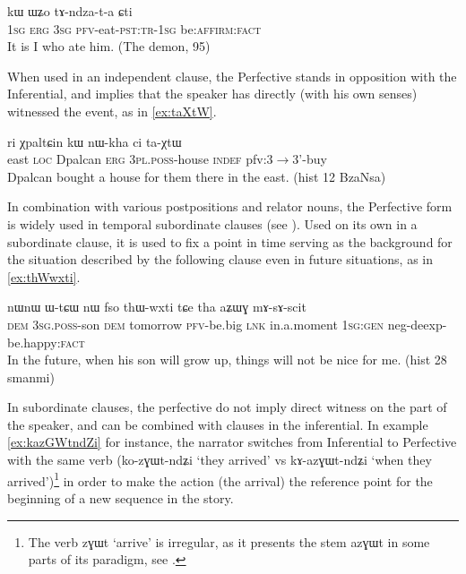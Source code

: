 \documentclass[oldfontcommands,oneside,a4paper,11pt]{article}
\newcommand{\ipa}[1]{{\phon \mbox{#1}}} %
\newcommand{\factual}[1]{\textsc{:fact}}
\begin{document}
\begin{exe}
\ex \label{ex:tAndzata}
\gll \ipa{aʑo} 	\ipa{kɯ} 	\ipa{ɯʑo} 	\ipa{tɤ-ndza-t-a} 	\ipa{ɕti} \\
\textsc{1sg} \textsc{erg} \textsc{3sg} \textsc{pfv}-eat-\textsc{pst:tr-1sg} be:\textsc{affirm:fact} \\
\glt It is I who ate him. (The demon, 95)
\end{exe}

When used in an independent clause,  the Perfective stands in opposition with the Inferential, and implies that the speaker has directly (with his own senses) witnessed the event, as in  \ref{ex:taXtW}.

\begin{exe}
\ex \label{ex:taXtW}
\gll \ipa{akɯ} 	\ipa{ri} 	\ipa{χpaltɕin} 	\ipa{kɯ} 	\ipa{nɯ-kha} 	\ipa{ci} 	\ipa{ta-χtɯ} \\
east \textsc{loc} Dpalcan \textsc{erg} \textsc{3pl.poss}-house \textsc{indef} pfv:3$\rightarrow$3'-buy \\
\glt Dpalcan bought a house for them there in the east. (hist 12 BzaNsa)
\end{exe}

In combination with various postpositions and relator nouns, the Perfective form is widely used in temporal subordinate clauses (see \citealt[284-93]{jacques14linking}). Used on its own in a subordinate clause, it is used to fix a point in time serving as the background for the situation described by the following clause even in future situations, as in \ref{ex:thWwxti}.

\begin{exe}
\ex \label{ex:thWwxti}
\gll 
\ipa{nɯnɯ} 	\ipa{ɯ-tɕɯ} 	\ipa{nɯ} 	\ipa{fso} 	\ipa{thɯ-wxti} 	\ipa{tɕe} 	\ipa{tha} 	\ipa{aʑɯɣ} 	\ipa{mɤ-sɤ-scit}  \\
\textsc{dem} \textsc{3sg.poss}-son \textsc{dem} tomorrow \textsc{pfv}-be.big \textsc{lnk} in.a.moment \textsc{1sg:gen} neg-deexp-be.happy\factual{} \\
\glt In the future, when his son will grow up, things will not be nice for me. (hist 28 smanmi)
\end{exe}

In subordinate clauses, the perfective do not imply direct witness on the part of the speaker, and can be combined with clauses in the inferential. In example \ref{ex:kazGWtndZi} for instance, the narrator switches from Inferential to Perfective with the same verb (\ipa{ko-zɣɯt-ndʑi} `they arrived' vs \ipa{kɤ-azɣɯt-ndʑi} `when they arrived')\footnote{The verb \ipa{zɣɯt} `arrive' is irregular, as it presents the stem \ipa{azɣɯt} in some parts of its paradigm, see \citet[424]{jacques04these}. } in order to make the action (the arrival) the reference point for the beginning of a new sequence in the story.
\end{document}
